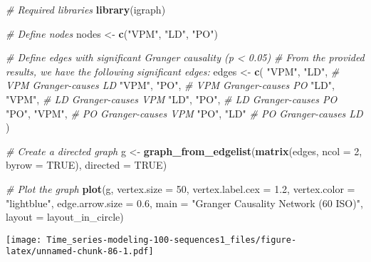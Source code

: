 \documentclass[
]{article}
\newenvironment{Shaded}{\begin{snugshade}}{\end{snugshade}}
\newcommand{\AttributeTok}[1]{\textcolor[rgb]{0.13,0.29,0.53}{#1}}
\newcommand{\CommentTok}[1]{\textcolor[rgb]{0.56,0.35,0.01}{\textit{#1}}}
\newcommand{\ConstantTok}[1]{\textcolor[rgb]{0.56,0.35,0.01}{#1}}
\newcommand{\DecValTok}[1]{\textcolor[rgb]{0.00,0.00,0.81}{#1}}
\newcommand{\FloatTok}[1]{\textcolor[rgb]{0.00,0.00,0.81}{#1}}
\newcommand{\FunctionTok}[1]{\textcolor[rgb]{0.13,0.29,0.53}{\textbf{#1}}}
\newcommand{\NormalTok}[1]{#1}
\newcommand{\OtherTok}[1]{\textcolor[rgb]{0.56,0.35,0.01}{#1}}
\newcommand{\StringTok}[1]{\textcolor[rgb]{0.31,0.60,0.02}{#1}}
\begin{document}
\begin{Shaded}
\begin{Highlighting}[]
\CommentTok{\# Required libraries}
\FunctionTok{library}\NormalTok{(igraph)}

\CommentTok{\# Define nodes}
\NormalTok{nodes }\OtherTok{\textless{}{-}} \FunctionTok{c}\NormalTok{(}\StringTok{"VPM"}\NormalTok{, }\StringTok{"LD"}\NormalTok{, }\StringTok{"PO"}\NormalTok{)}

\CommentTok{\# Define edges with significant Granger causality (p \textless{} 0.05)}
\CommentTok{\# From the provided results, we have the following significant edges:}
\NormalTok{edges }\OtherTok{\textless{}{-}} \FunctionTok{c}\NormalTok{(}
  \StringTok{"VPM"}\NormalTok{, }\StringTok{"LD"}\NormalTok{,  }\CommentTok{\# VPM Granger{-}causes LD}
  \StringTok{"VPM"}\NormalTok{, }\StringTok{"PO"}\NormalTok{,  }\CommentTok{\# VPM Granger{-}causes PO}
  \StringTok{"LD"}\NormalTok{, }\StringTok{"VPM"}\NormalTok{,  }\CommentTok{\# LD Granger{-}causes VPM}
  \StringTok{"LD"}\NormalTok{, }\StringTok{"PO"}\NormalTok{,   }\CommentTok{\# LD Granger{-}causes PO}
  \StringTok{"PO"}\NormalTok{, }\StringTok{"VPM"}\NormalTok{,  }\CommentTok{\# PO Granger{-}causes VPM}
  \StringTok{"PO"}\NormalTok{, }\StringTok{"LD"}    \CommentTok{\# PO Granger{-}causes LD}
\NormalTok{)}

\CommentTok{\# Create a directed graph}
\NormalTok{g }\OtherTok{\textless{}{-}} \FunctionTok{graph\_from\_edgelist}\NormalTok{(}\FunctionTok{matrix}\NormalTok{(edges, }\AttributeTok{ncol =} \DecValTok{2}\NormalTok{, }\AttributeTok{byrow =} \ConstantTok{TRUE}\NormalTok{), }\AttributeTok{directed =} \ConstantTok{TRUE}\NormalTok{)}

\CommentTok{\# Plot the graph}
\FunctionTok{plot}\NormalTok{(g,}
     \AttributeTok{vertex.size =} \DecValTok{50}\NormalTok{,}
     \AttributeTok{vertex.label.cex =} \FloatTok{1.2}\NormalTok{,}
     \AttributeTok{vertex.color =} \StringTok{"lightblue"}\NormalTok{,}
     \AttributeTok{edge.arrow.size =} \FloatTok{0.6}\NormalTok{,}
     \AttributeTok{main =} \StringTok{"Granger Causality Network (60 ISO)"}\NormalTok{,}
     \AttributeTok{layout =}\NormalTok{ layout\_in\_circle)}
\end{Highlighting}
\end{Shaded}

\texttt{[image: Time\_series-modeling-100-sequences1\_files/figure-latex/unnamed-chunk-86-1.pdf]}
\end{document}
